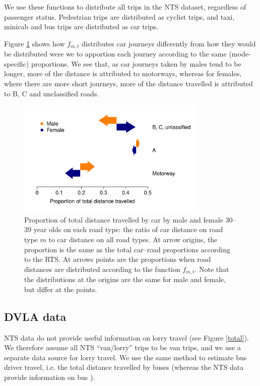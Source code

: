 \documentclass{article}
\begin{document}
We use these functions to distribute all trips in the NTS dataset, regardless of passenger status. Pedestrian trips are distributed as cyclist trips, and taxi, minicab and bus trips are distributed as car trips.

Figure \ref{carMF30} shows how $f_{m,t}$ distributes car journeys differently from how they would be distributed were we to apportion each journey according to the same (mode-specific) proportions. We see that, as car journeys taken by males tend to be longer, more of the distance is attributed to motorways, whereas for females, where there are more short journeys, more of the distance travelled is attributed to B, C and unclassified roads.

\begin{figure}[H]
\centering
\includegraphics[width=0.8\textwidth]{carMF30.pdf}
\caption[Proportion of total distance travelled by car by male and female 30--39 year olds on each road type.]{\small Proportion of total distance travelled by car by male and female 30--39 year olds on each road type: the ratio of car distance on road type $m$ to car distance on all road types. At arrow origins, the proportion is the same as the total car--road proportions according to the RTS. At arrows points are the proportions when road distances are distributed according to the function $f_{m,t}$. Note that the distributions at the origins are the same for male and female, but differ at the points.}
\label{carMF30}
\end{figure}


\subsection{DVLA data}\label{dvla}

NTS data do not provide useful information on lorry travel (see Figure \ref{total}). We therefore assume all NTS ``van/lorry'' trips to be van trips, and we use a separate data source for lorry travel. We use the same method to estimate bus driver travel, i.e. the total distance travelled by buses (whereas the NTS data provide information on bus ).
\end{document}
